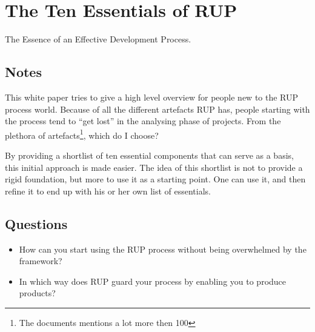 \chapter{The Ten Essentials of RUP \cite{tenessentials}}
The Essence of an Effective Development Process.
\section{Notes}
This white paper tries to give a high level overview for people new to the RUP process world. 
Because of all the different artefacts RUP has, people starting with the process tend to ``get lost'' in the analysing phase of projects. 
From the plethora of artefacts\footnote{The documents mentions a lot more then 100}, which do I choose?

By providing a shortlist of ten essential components that can serve as a basis, this initial approach is made easier.
The idea of this shortlist is not to provide a rigid foundation, but more to use it as a starting point. 
One can use it, and then refine it to end up with his or her own list of essentials. 

\section{Questions}
\begin{itemize}
  \item How can you start using the RUP process without being overwhelmed by the framework?
  \item In which way does RUP guard your process by enabling you to produce products?
\end{itemize}
